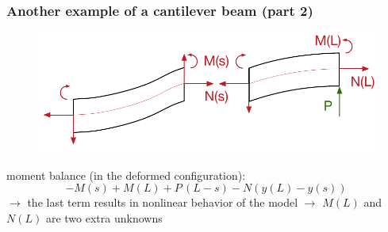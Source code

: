\begin{frame}
  \frametitle{Another example of a cantilever beam (part 2)}
  
  \vspace{-0.7em}
  \begin{figure}
    \centering
    \includegraphics[width=20cm, keepaspectratio=true]{sections/traditional_beams/images/TimoshenkoCanitleverExample2part2}
  \end{figure}
  
  moment balance (in the deformed configuration):
  \begin{displaymath}
    -M(s) + M(L) + P \, (L-s) - N(y(L)-y(s))
  \end{displaymath}
  $\rightarrow$ the last term results in nonlinear behavior of the model \newline
  $\rightarrow$ $M(L)$ and $N(L)$ are two extra unknowns \newline
\end{frame}